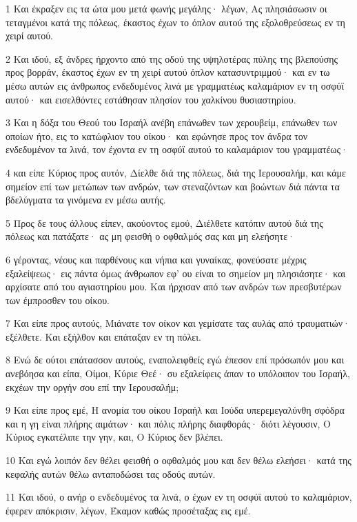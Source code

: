 \par 1 Και έκραξεν εις τα ώτα μου μετά φωνής μεγάλης· λέγων, Ας πλησιάσωσιν οι τεταγμένοι κατά της πόλεως, έκαστος έχων το όπλον αυτού της εξολοθρεύσεως εν τη χειρί αυτού.
\par 2 Και ιδού, εξ άνδρες ήρχοντο από της οδού της υψηλοτέρας πύλης της βλεπούσης προς βορράν, έκαστος έχων εν τη χειρί αυτού όπλον κατασυντριμμού· και εν τω μέσω αυτών εις άνθρωπος ενδεδυμένος λινά με γραμματέως καλαμάριον εν τη οσφύϊ αυτού· και εισελθόντες εστάθησαν πλησίον του χαλκίνου θυσιαστηρίου.
\par 3 Και η δόξα του Θεού του Ισραήλ ανέβη επάνωθεν των χερουβείμ, επάνωθεν των οποίων ήτο, εις το κατώφλιον του οίκου· και εφώνησε προς τον άνδρα τον ενδεδυμένον τα λινά, τον έχοντα εν τη οσφύϊ αυτού το καλαμάριον του γραμματέως·
\par 4 και είπε Κύριος προς αυτόν, Δίελθε διά της πόλεως, διά της Ιερουσαλήμ, και κάμε σημείον επί των μετώπων των ανδρών, των στεναζόντων και βοώντων διά πάντα τα βδελύγματα τα γινόμενα εν μέσω αυτής.
\par 5 Προς δε τους άλλους είπεν, ακούοντος εμού, Διέλθετε κατόπιν αυτού διά της πόλεως και πατάξατε· ας μη φεισθή ο οφθαλμός σας και μη ελεήσητε·
\par 6 γέροντας, νέους και παρθένους και νήπια και γυναίκας, φονεύσατε μέχρις εξαλείψεως· εις πάντα όμως άνθρωπον εφ' ου είναι το σημείον μη πλησιάσητε· και αρχίσατε από του αγιαστηρίου μου. Και ήρχισαν από των ανδρών των πρεσβυτέρων των έμπροσθεν του οίκου.
\par 7 Και είπε προς αυτούς, Μιάνατε τον οίκον και γεμίσατε τας αυλάς από τραυματιών· εξέλθετε. Και εξήλθον και επάταξαν εν τη πόλει.
\par 8 Ενώ δε ούτοι επάτασσον αυτούς, εναπολειφθείς εγώ έπεσον επί πρόσωπόν μου και ανεβόησα και είπα, Οίμοι, Κύριε Θεέ· συ εξαλείφεις άπαν το υπόλοιπον του Ισραήλ, εκχέων την οργήν σου επί την Ιερουσαλήμ;
\par 9 Και είπε προς εμέ, Η ανομία του οίκου Ισραήλ και Ιούδα υπερεμεγαλύνθη σφόδρα και η γη είναι πλήρης αιμάτων· και πόλις πλήρης διαφθοράς· διότι λέγουσιν, Ο Κύριος εγκατέλιπε την γην, και, Ο Κύριος δεν βλέπει.
\par 10 Και εγώ λοιπόν δεν θέλει φεισθή ο οφθαλμός μου και δεν θέλω ελεήσει· κατά της κεφαλής αυτών θέλω ανταποδώσει τας οδούς αυτών.
\par 11 Και ιδού, ο ανήρ ο ενδεδυμένος τα λινά, ο έχων εν τη οσφύϊ αυτού το καλαμάριον, έφερεν απόκρισιν, λέγων, Έκαμον καθώς προσέταξας εις εμέ.

